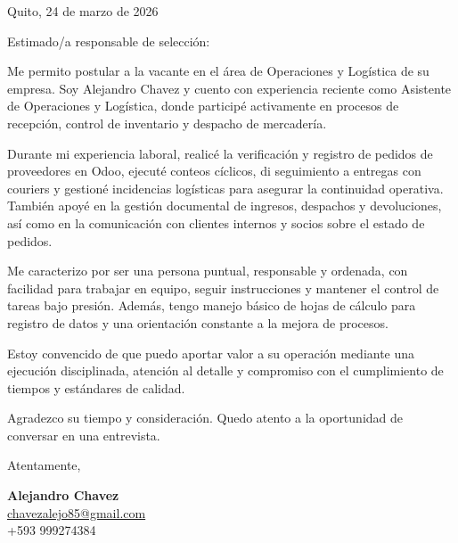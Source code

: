 \documentclass[11pt,a4paper]{article}
\begin{document}
\begin{flushright}
Quito, 24 de marzo de 2026
\end{flushright}

\noindent Estimado/a responsable de selecci\'on:

Me permito postular a la vacante en el \'area de Operaciones y Log\'istica de su empresa. Soy Alejandro Chavez y cuento con experiencia reciente como Asistente de Operaciones y Log\'istica, donde particip\'e activamente en procesos de recepci\'on, control de inventario y despacho de mercader\'ia.

Durante mi experiencia laboral, realic\'e la verificaci\'on y registro de pedidos de proveedores en Odoo, ejecut\'e conteos c\'iclicos, di seguimiento a entregas con couriers y gestion\'e incidencias log\'isticas para asegurar la continuidad operativa. Tambi\'en apoy\'e en la gesti\'on documental de ingresos, despachos y devoluciones, as\'i como en la comunicaci\'on con clientes internos y socios sobre el estado de pedidos.

Me caracterizo por ser una persona puntual, responsable y ordenada, con facilidad para trabajar en equipo, seguir instrucciones y mantener el control de tareas bajo presi\'on. Adem\'as, tengo manejo b\'asico de hojas de c\'alculo para registro de datos y una orientaci\'on constante a la mejora de procesos.

Estoy convencido de que puedo aportar valor a su operaci\'on mediante una ejecuci\'on disciplinada, atenci\'on al detalle y compromiso con el cumplimiento de tiempos y est\'andares de calidad.

Agradezco su tiempo y consideraci\'on. Quedo atento a la oportunidad de conversar en una entrevista.

\vspace{1.2em}
\noindent Atentamente,

\vspace{1.2em}
\noindent \textbf{Alejandro Chavez}\\
\href{mailto:chavezalejo85@gmail.com}{chavezalejo85@gmail.com}\\
+593 999274384
\end{document}
